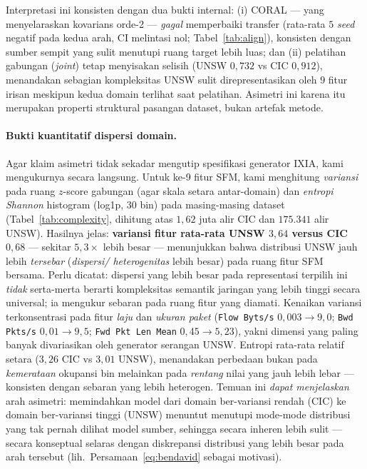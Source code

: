 \documentclass[11pt,a4paper]{article}
\begin{document}
Interpretasi ini konsisten dengan dua bukti internal: (i) CORAL --- yang
menyelaraskan kovarians orde-2 --- \emph{gagal} memperbaiki transfer (rata-rata
$5$ \emph{seed} negatif pada kedua arah, CI melintasi nol; Tabel~\ref{tab:align}),
konsisten dengan sumber sempit yang sulit menutupi ruang target lebih luas; dan (ii) pelatihan
gabungan (\emph{joint}) tetap menyisakan selisih (UNSW $0{,}732$ vs CIC $0{,}912$),
menandakan sebagian kompleksitas UNSW sulit direpresentasikan oleh $9$ fitur
irisan meskipun kedua domain terlihat saat pelatihan. Asimetri ini karena itu
merupakan properti struktural pasangan dataset, bukan artefak metode.

\paragraph{Bukti kuantitatif dispersi domain.} Agar klaim asimetri tidak sekadar
mengutip spesifikasi generator IXIA, kami mengukurnya secara langsung. Untuk ke-9
fitur SFM, kami menghitung \emph{variansi} pada ruang $z$-score gabungan (agar skala
setara antar-domain) dan \emph{entropi Shannon} histogram (log1p, 30 bin) pada
masing-masing dataset (Tabel~\ref{tab:complexity}, dihitung atas $1{,}62$ juta alir
CIC dan $175{.}341$ alir UNSW). Hasilnya jelas: \textbf{variansi fitur rata-rata
UNSW $3{,}64$ versus CIC $0{,}68$} --- sekitar $5{,}3\times$ lebih besar ---
menunjukkan bahwa distribusi UNSW jauh lebih \emph{tersebar} (\emph{dispersi/
heterogenitas} lebih besar) pada ruang fitur SFM bersama. Perlu dicatat: dispersi
yang lebih besar pada representasi terpilih ini \emph{tidak} serta-merta berarti
kompleksitas semantik jaringan yang lebih tinggi secara universal; ia mengukur
sebaran pada ruang fitur yang diamati. Kenaikan variansi terkonsentrasi pada fitur
\emph{laju} dan \emph{ukuran paket} (\texttt{Flow Byts/s} $0{,}003\rightarrow 9{,}0$;
\texttt{Bwd Pkts/s} $0{,}01\rightarrow 9{,}5$; \texttt{Fwd Pkt Len Mean}
$0{,}45\rightarrow 5{,}23$), yakni dimensi yang paling banyak divariasikan oleh
generator serangan UNSW. Entropi rata-rata relatif setara ($3{,}26$ CIC vs $3{,}01$
UNSW), menandakan perbedaan bukan pada \emph{kemerataan} okupansi bin melainkan pada
\emph{rentang} nilai yang jauh lebih lebar --- konsisten dengan sebaran yang lebih
heterogen. Temuan ini \emph{dapat menjelaskan} arah asimetri: memindahkan model dari
domain ber-variansi rendah (CIC) ke domain ber-variansi tinggi (UNSW) menuntut
menutupi mode-mode distribusi yang tak pernah dilihat model sumber, sehingga secara
inheren lebih sulit --- secara konseptual selaras dengan diskrepansi distribusi yang
lebih besar pada arah tersebut (lih.\ Persamaan~\eqref{eq:bendavid} sebagai motivasi).
\end{document}
